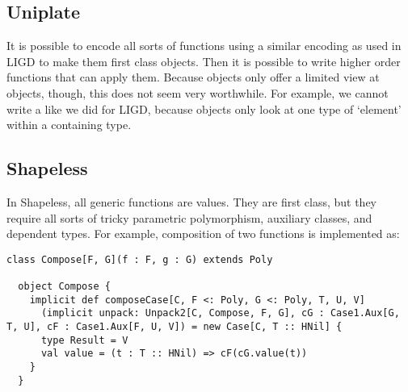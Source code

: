 

\subsection{Uniplate}
It is possible to encode all sorts of functions using a similar encoding
as used in LIGD to make them first class objects. Then it is possible to write
higher order functions that can apply them. Because  objects only offer
a limited view at objects, though, this does not seem very worthwhile. For
example, we cannot write a  like we did for LIGD, because
 objects only look at one type of `element' within a containing
type.


\subsection{Shapeless}
In Shapeless, all generic functions are  values. They are first class,
but they require all sorts of tricky parametric polymorphism, auxiliary
classes, and dependent types. For example, composition of two functions is
implemented as:
\begin{lstlisting}[caption=Composition of two Poly values (copied from shapeless),style=breaklines]
  class Compose[F, G](f : F, g : G) extends Poly

  object Compose {
    implicit def composeCase[C, F <: Poly, G <: Poly, T, U, V]
      (implicit unpack: Unpack2[C, Compose, F, G], cG : Case1.Aux[G, T, U], cF : Case1.Aux[F, U, V]) = new Case[C, T :: HNil] {
      type Result = V
      val value = (t : T :: HNil) => cF(cG.value(t))
    }
  }
\end{lstlisting}
